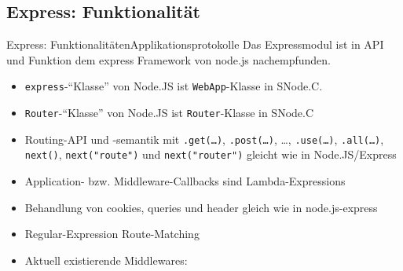 \subsection{Express: Funktionalität}

\begin{frame}{Express: Funktionalitäten}{Applikationsprotokolle}
  Das Expressmodul ist in API und Funktion dem express Framework von node.js nachempfunden.
  \begin{itemize}
    \item \texttt{express}-"`Klasse"' von Node.JS ist \texttt{WebApp}-Klasse in SNode.C.
    \item \texttt{Router}-"`Klasse"' von Node.JS ist \texttt{Router}-Klasse in SNode.C
    \item Routing-API und -semantik mit \texttt{.get(\ldots)}, \texttt{.post(\ldots)}, \ldots, \texttt{.use(\ldots)}, \texttt{.all(\ldots)}, \texttt{next()}, \texttt{next("route")} und \texttt{next("router")} gleicht wie in Node.JS/Express
    \item Application- bzw. Middleware-Callbacks sind \alert{Lambda}-Expressions
    \item Behandlung von \alert{cookies}, \alert{queries} und \alert{header} gleich wie in node.js-express
    \item \alert{Regular-Expression} Route-Matching
    \item Aktuell existierende Middlewares:
  \end{itemize}
\end{frame}
